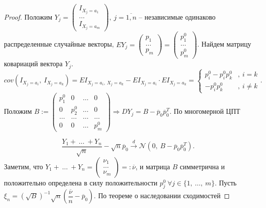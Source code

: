 \begin{proof}
    Положим $\displaystyle Y_{j} =\begin{pmatrix}
    I_{X_{j} =a_{1}}\\
    \dotsc \\
    I_{X_{j} =a_{m}}
    \end{pmatrix} ,\ j=\overline{1,n}$ -- независимые одинаково распределенные случайные векторы, $\displaystyle EY_{j} =\begin{pmatrix}
    p_{1}\\
    \dotsc \\
    p_{m}
    \end{pmatrix} =\begin{pmatrix}
    p_{1}^{0}\\
    \dotsc \\
    p_{m}^{0}
    \end{pmatrix}$. Найдем матрицу ковариаций вектора $\displaystyle Y_{j}$.
    \begin{equation*}
        cov( I_{X_{j} =a_{i}} ,\ I_{X_{j} =a_{k}}) =EI_{X_{j} =a_{i} ,\ X_{j} =a_{k}} -EI_{X_{j} =a_{i}} \cdotp EI_{X_{j} =a_{k}} =\begin{cases}
        p_{i}^{0} -p_{i}^{0} p_{k}^{0} & ,\ i=k\\
        -p_{i}^{0} p_{k}^{0} & ,\ i\neq k
        \end{cases} .
    \end{equation*}
    Положим $\displaystyle B:=\begin{pmatrix}
    p_{1}^{0} & 0 & \dotsc  & 0\\
    0 & p_{2}^{0} & \dotsc  & 0\\
    \dotsc  & \dotsc  & \dotsc  & \dotsc \\
    0 & 0 & \dotsc  & p_{m}^{0}
    \end{pmatrix} \Rightarrow DY_{j} =B-\overline{p}_{0}\overline{p}_{0}^{T}$. По многомерной ЦПТ
    
    
    \begin{equation*}
        \dfrac{Y_{1} +\ \dotsc \ +Y_{n}}{\sqrt{n}} -\sqrt{n}\overline{p}_{0}\xrightarrow{d}\mathcal{N}\left( 0,\ B-\overline{p}_{0}\overline{p}_{0}^{T}\right) .
    \end{equation*}
    Заметим, что $\displaystyle Y_{1} +\ \dotsc \ +Y_{n} =\begin{pmatrix}
    \nu _{1}\\
    \dotsc \\
    \nu _{m}
    \end{pmatrix} =:\overline{\nu }$, и матрица $\displaystyle B$ симметрична и положительно определена в силу положительности $\displaystyle p_{j}^{0} \ \forall j\in \{1,\ \dotsc ,\ m\}$. Пусть $\displaystyle \xi _{n} =\left(\sqrt{B}\right)^{-1}\sqrt{n}\left(\dfrac{\overline{\nu }}{n} -\overline{p}_{0}\right)$. По теореме о наследовании сходимостей
    

\end{proof}
